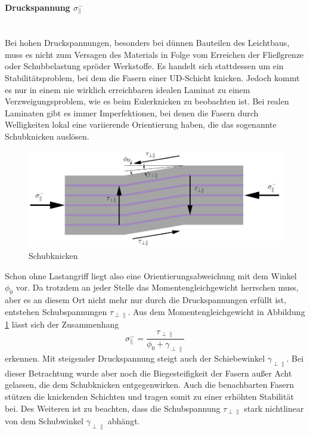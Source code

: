 \paragraph{Druckspannung $\sigma_{\parallel}^-$}~\\
Bei hohen Druckspannungen, besonders bei dünnen Bauteilen des Leichtbaus, muss es nicht zum Versagen des Materials in Folge vom Erreichen der Fließgrenze oder Schubbelastung spröder Werkstoffe. Es handelt sich stattdessen um ein Stabilitätsproblem, bei dem die Fasern einer UD-Schicht knicken. Jedoch kommt es nur in einem nie wirklich erreichbaren idealen Laminat zu einem Verzweigungsproblem, wie es beim Eulerknicken zu beobachten ist. Bei realen Laminaten gibt es immer Imperfektionen, bei denen die Fasern durch Welligkeiten lokal eine variierende Orientierung haben, die das sogenannte Schubknicken auslösen.
\begin{figure}
	\includegraphics[width=1.0\textwidth]{Bilder/Schubknicken.png}
	\caption{Schubknicken}
	\label{fig:Schubknicken}
\end{figure} 
Schon ohne Lastangriff liegt also eine Orientierungsabweichung mit dem Winkel $\phi_0$ vor. Da trotzdem an jeder Stelle das Momentengleichgewicht herrschen muss, aber es an diesem Ort nicht mehr nur durch die Druckspannungen erfüllt ist, entstehen Schubspannungen $\tau_{\perp\parallel}$. Aus dem Momentengleichgewicht in Abbildung \ref{fig:Schubknicken} lässt sich der Zusammenhang
\begin{equation}\label{SchubknickSigma}
	\sigma_{\parallel}^-=\frac{\tau_{\perp\parallel}}{\phi_0 + \gamma_{\perp\parallel}}
\end{equation}
erkennen. Mit steigender Druckspannung steigt auch der Schiebewinkel $\gamma_{\perp\parallel}$. Bei dieser Betrachtung wurde aber noch die Biegesteifigkeit der Fasern außer Acht gelassen, die dem Schubknicken entgegenwirken. Auch die benachbarten Fasern stützen die knickenden Schichten und tragen somit zu einer erhöhten Stabilität bei. Des Weiteren ist zu beachten, dass die Schubspannung $\tau_{\perp\parallel}$ stark nichtlinear von dem Schubwinkel $\gamma_{\perp\parallel}$ abhängt. 
